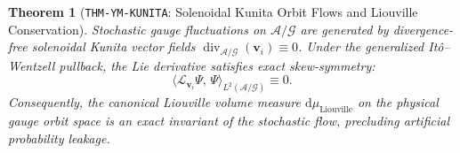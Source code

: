 \documentclass[11pt,a4paper,reqno]{article}
\theoremstyle{plain}
\newtheorem{theorem}{Theorem}[section]
\theoremstyle{definition}
\theoremstyle{remark}
\numberwithin{equation}{section}
\providecommand{\diff}{\mathrm{d}}
\begin{document}
\begin{theorem}[\texttt{THM-YM-KUNITA}: Solenoidal Kunita Orbit Flows and Liouville Conservation]
\label{thm:ym_kunita_flow}
Stochastic gauge fluctuations on $\mathcal{A}/\mathcal{G}$ are generated by divergence-free solenoidal Kunita vector fields $\operatorname{div}_{\mathcal{A}/\mathcal{G}}(\mathbf{v}_i) \equiv 0$. Under the generalized It\^o--Wentzell pullback, the Lie derivative satisfies exact skew-symmetry:
\begin{equation}
  \langle \mathcal{L}_{\mathbf{v}_i} \Psi, \, \Psi \rangle_{L^2(\mathcal{A}/\mathcal{G})} \equiv 0.
\end{equation}
Consequently, the canonical Liouville volume measure $\diff\mu_{\mathrm{Liouville}}$ on the physical gauge orbit space is an exact invariant of the stochastic flow, precluding artificial probability leakage.
\end{theorem}
\end{document}
